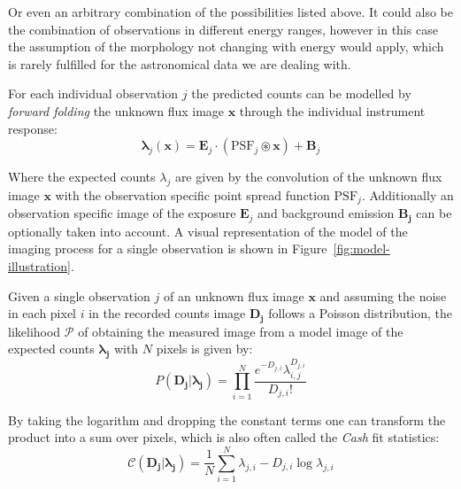 \documentclass[twocolumn]{aastex631}
\begin{document}
    Or even an arbitrary combination of the possibilities listed above. It could also be the combination of observations in different energy ranges, however in this case the assumption of the morphology not changing with energy would apply, which is rarely fulfilled for the astronomical data we are dealing with.
    
    For each individual observation $j$ the predicted counts can be modelled by \textit{forward folding} the unknown flux image $\mathbf{x}$ through the individual instrument response:
    \begin{equation}
        \label{eq:model}
        \boldsymbol{\lambda}_j(\mathbf{x}) = \mathbf{E}_j \cdot \left(\mathrm{PSF}_j \circledast \mathbf{x}\right) + \mathbf{B}_j
    \end{equation}

    Where the expected counts $\lambda_j$ are given by the convolution of the unknown 
    flux image $\mathbf{x}$ with the observation specific point spread function $\mathrm{PSF}_j$. Additionally an observation specific image of the exposure $\mathbf{E}_j$ and background emission $\mathbf{B_j}$ can be optionally taken into account. A visual representation of the model of the imaging process for a single observation is shown in Figure~\ref{fig:model-illustration}.

    Given a single observation $j$ of an unknown flux image
    $\mathbf{x}$ and assuming the noise in each pixel $i$ in the recorded counts image
    $\mathbf{D_j}$ follows a Poisson distribution, the likelihood $\mathcal{P}$
    of obtaining the measured image from a model image of the expected
    counts $\boldsymbol{\lambda_j}$ with $N$ pixels is given by:
    \begin{equation}
        \label{eq:poisson}
        P\left( \mathbf{D_j} | \boldsymbol{\lambda_j} \right) = \prod_{i=1}^N \frac{{e^{ - D_{j,i} } \lambda_{i,j} ^ {D_{j,i}}}}{{D_{j,i}!}}
    \end{equation}

    By taking the logarithm and dropping the constant terms one can transform the
    product into a sum over pixels, which is also often called the \textit{Cash}
    \citep{Cash1979} fit statistics:
    \begin{equation}
        \label{eq:cash}
        \mathcal{C}\left( \mathbf{D_j} | \boldsymbol{\lambda_j} \right) = \frac{1}{N}\sum_{i=1}^N \lambda_{j,i} - D_{j, i} \log{\lambda_{j,i}}
    \end{equation}
\end{document}

